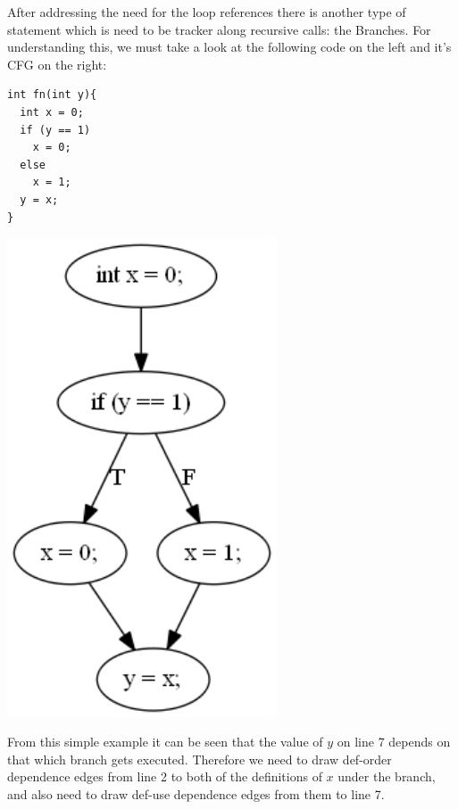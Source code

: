 \documentclass[oneside,12pt,a4paper]{book}
\begin{document}
After addressing the need for the loop references there is another type of statement which is need to be tracker along recursive calls: the Branches. For understanding this, we must take a look at the following code on the left and it's CFG on the right:

\begin{minipage}[c]{0.5\textwidth}
\begin{lstlisting}
int fn(int y){
  int x = 0;
  if (y == 1)
    x = 0;
  else
    x = 1;
  y = x;
}
\end{lstlisting}
\end{minipage}%
\begin{minipage}[c]{0.5\textwidth}
\centering
\includegraphics[width=0.6\textwidth]{if_test_cfg.png}
\end{minipage}

From this simple example it can be seen that the value of $y$ on line 7 depends on that which branch gets executed. Therefore we need to draw def-order dependence edges from line 2 to both of the definitions of $x$ under the branch, and also need to draw def-use dependence edges from them to line 7.
\end{document}
